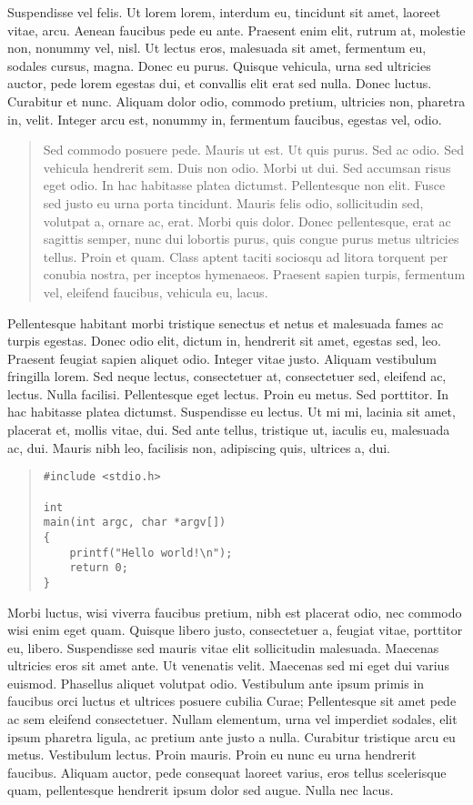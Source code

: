 \documentclass{article}
\begin{document}
Suspendisse vel felis. Ut lorem lorem, interdum eu, tincidunt sit amet,
laoreet vitae, arcu. Aenean faucibus pede eu ante. Praesent enim elit, rutrum
at, molestie non, nonummy vel, nisl. Ut lectus eros, malesuada sit amet,
fermentum eu, sodales cursus, magna. Donec eu purus. Quisque vehicula, urna sed
ultricies auctor, pede lorem egestas dui, et convallis elit erat sed nulla.
Donec luctus. Curabitur et nunc. Aliquam dolor odio, commodo pretium, ultricies
non, pharetra in, velit. Integer arcu est, nonummy in, fermentum faucibus,
egestas vel, odio.

\begin{quote}
Sed commodo posuere pede. Mauris ut est. Ut quis purus. Sed ac odio. Sed
vehicula hendrerit sem. Duis non odio. Morbi ut dui. Sed accumsan risus eget
odio. In hac habitasse platea dictumst. Pellentesque non elit. Fusce sed justo
eu urna porta tincidunt. Mauris felis odio, sollicitudin sed, volutpat a,
ornare ac, erat. Morbi quis dolor. Donec pellentesque, erat ac sagittis semper,
nunc dui lobortis purus, quis congue purus metus ultricies tellus. Proin et
quam. Class aptent taciti sociosqu ad litora torquent per conubia nostra, per
inceptos hymenaeos. Praesent sapien turpis, fermentum vel, eleifend faucibus,
vehicula eu, lacus.
\end{quote}

Pellentesque habitant morbi tristique senectus et netus et malesuada fames ac
turpis egestas. Donec odio elit, dictum in, hendrerit sit amet, egestas sed,
leo. Praesent feugiat sapien aliquet odio. Integer vitae justo. Aliquam
vestibulum
fringilla lorem. Sed neque lectus, consectetuer at, consectetuer sed, eleifend ac,
lectus. Nulla facilisi. Pellentesque eget lectus. Proin eu metus. Sed
porttitor. In hac habitasse platea dictumst. Suspendisse eu lectus. Ut mi mi,
lacinia sit amet, placerat et, mollis vitae, dui. Sed ante tellus, tristique
ut, iaculis eu, malesuada ac, dui. Mauris nibh leo, facilisis non, adipiscing
quis, ultrices a, dui.

\begin{quote}
\begin{verbatim}
#include <stdio.h>

int
main(int argc, char *argv[])
{
    printf("Hello world!\n");
    return 0;
}
\end{verbatim}
\end{quote}

Morbi luctus, wisi viverra faucibus pretium, nibh est placerat odio, nec
commodo wisi enim eget quam. Quisque libero justo, consectetuer a, feugiat
vitae, porttitor eu, libero. Suspendisse sed mauris vitae elit sollicitudin
malesuada. Maecenas ultricies eros sit amet ante. Ut venenatis velit. Maecenas
sed mi eget dui varius euismod. Phasellus aliquet volutpat odio. Vestibulum
ante ipsum primis in faucibus orci luctus et ultrices posuere cubilia Curae;
Pellentesque sit amet pede ac sem eleifend consectetuer. Nullam elementum, urna
vel imperdiet sodales, elit ipsum pharetra ligula, ac pretium ante justo a
nulla. Curabitur tristique arcu eu metus. Vestibulum lectus. Proin mauris.
Proin eu nunc eu urna hendrerit faucibus. Aliquam auctor, pede consequat
laoreet varius, eros tellus scelerisque quam, pellentesque hendrerit ipsum
dolor sed augue. Nulla nec lacus.
\end{document}
